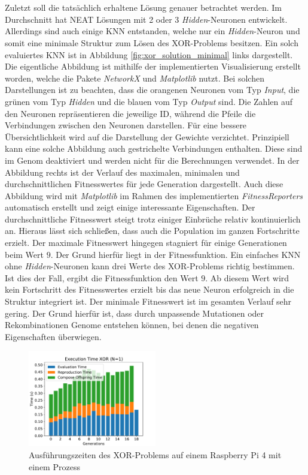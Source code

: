 \\\\
Zuletzt soll die tatsächlich erhaltene Lösung genauer betrachtet werden. Im Durchschnitt hat \ac{NEAT} Lösungen mit 2 oder 3 \emph{Hidden}-Neuronen entwickelt. Allerdings sind auch einige \ac{KNN} entstanden, welche nur ein \emph{Hidden}-Neuron und somit eine minimale Struktur zum Lösen des XOR-Problems besitzen. Ein solch evaluiertes \ac{KNN} ist in Abbildung \ref{fig:xor_solution_minimal} links dargestellt. Die eigentliche Abbildung ist mithilfe der implementierten Visualisierung erstellt worden, welche die Pakete \emph{NetworkX} und \emph{Matplotlib} nutzt. Bei solchen Darstellungen ist zu beachten, dass die orangenen Neuronen vom Typ \emph{Input}, die grünen vom Typ \emph{Hidden} und die blauen vom Typ \emph{Output} sind. Die Zahlen auf den Neuronen repräsentieren die jeweilige ID, während die Pfeile die Verbindungen zwischen den Neuronen darstellen. Für eine bessere Übersichtlichkeit wird auf die Darstellung der Gewichte verzichtet. Prinzipiell kann eine solche Abbildung auch gestrichelte Verbindungen enthalten. Diese sind im Genom deaktiviert und werden nicht für die Berechnungen verwendet. In der Abbildung rechts ist der Verlauf des maximalen, minimalen und durchschnittlichen Fitnesswertes für jede Generation dargestellt. Auch diese Abbildung wird mit \emph{Matplotlib} im Rahmen des implementierten \emph{FitnessReporters} automatisch erstellt und zeigt einige interessante Eigenschaften. Der durchschnittliche Fitnesswert steigt trotz einiger Einbrüche relativ kontinuierlich an. Hieraus lässt sich schließen, dass auch die Population im ganzen Fortschritte erzielt. Der maximale Fitnesswert hingegen stagniert für einige Generationen beim Wert $9$. Der Grund hierfür liegt in der Fitnessfunktion. Ein einfaches \ac{KNN} ohne \emph{Hidden}-Neuronen kann drei Werte des XOR-Problems richtig bestimmen. Ist dies der Fall, ergibt die Fitnessfunktion den Wert $9$. Ab diesem Wert wird kein Fortschritt des Fitnesswertes erzielt bis das neue Neuron erfolgreich in die Struktur integriert ist. Der minimale Fitnesswert ist im gesamten Verlauf sehr gering. Der Grund hierfür ist, dass durch unpassende Mutationen oder Rekombinationen Genome entstehen können, bei denen die negativen Eigenschaften überwiegen. 
\begin{figure}[!h]
	\centering
	\includegraphics[width=0.5\textwidth]{./img/xor_single_core/xor_execution_time_1.pdf} 
	\caption{Ausführungszeiten des XOR-Problems auf einem Raspberry Pi 4 mit einem Prozess}
	\label{fig:xor_single_core_performance}
\end{figure}
